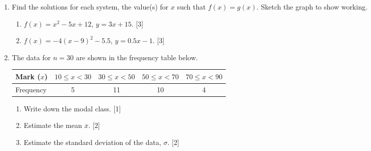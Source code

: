 \documentclass[12pt, twoside]{article}
\begin{document}
\begin{enumerate}
\newpage
    \item Find the solutions for each system, the value(s) for $x$ such that $f(x)=g(x)$. Sketch the graph to show working.
    \begin{enumerate}
        \item $f(x)=x^2-5x+12$, $y=3x+15$. \hfill [3] \vspace{0.3cm}
        \item $f(x)=-4(x-9)^2-5.5$, $y=0.5x-1$.  \hfill [3]
    \end{enumerate}

\item The data for  $n=30$ are shown in the frequency table below.
    \begin{center}
        \begin{tabular}{|l|c|c|c|c|}
            \hline
            Mark ($x$) & $10 \leq x < 30$ & $30 \leq x < 50$ & $50 \leq x < 70$ & $70 \leq x < 90$\\ 
            \hline 
            Frequency & 5 & 11 & 10 & 4\\ 
            \hline 
            \end{tabular}
    \end{center}
    \begin{enumerate}
        \item Write down the modal class.  \hfill [1]
        \item Estimate the mean $\overline{x}$. \hfill [2]
        \item Estimate the standard deviation of the data, $\sigma$.  \hfill [2]
        \end{enumerate}
           
\end{enumerate}
\end{document}
